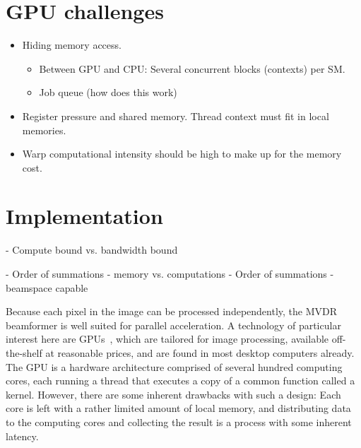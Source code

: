\documentclass[12pt,journal,captionsoff,onecolumn]{IEEEtran}
\newcommand\1{\vec 1}
\begin{document}
\section{GPU challenges}

\begin{itemize}
\item Hiding memory access.
\begin{itemize}
\item Between GPU and CPU: Several concurrent blocks (contexts) per SM.
\item Job queue (how does this work)
\end{itemize}
\item Register pressure and shared memory. Thread context must fit in local memories.
\item Warp computational intensity should be high to make up for the memory cost.
\end{itemize}



\section{Implementation}

- Compute bound vs. bandwidth bound

- Order of summations - memory vs. computations
- Order of summations - beamspace capable


Because each pixel in the image can be processed independently, the \gls{MVDR} beamformer is well suited for parallel acceleration. A technology of particular interest here are \glspl{GPU}~\cite{Nilsen2009}, which are tailored for image processing, available off-the-shelf at reasonable prices, and are found in most desktop computers already. The \gls{GPU} is a hardware architecture comprised of several hundred computing cores, each running a thread that executes a copy of a common function called a kernel.  However, there are some inherent drawbacks with such a design: Each core is left with a rather limited amount of local memory, and distributing data to the computing cores and collecting the result is a process with some inherent latency.
\end{document}
